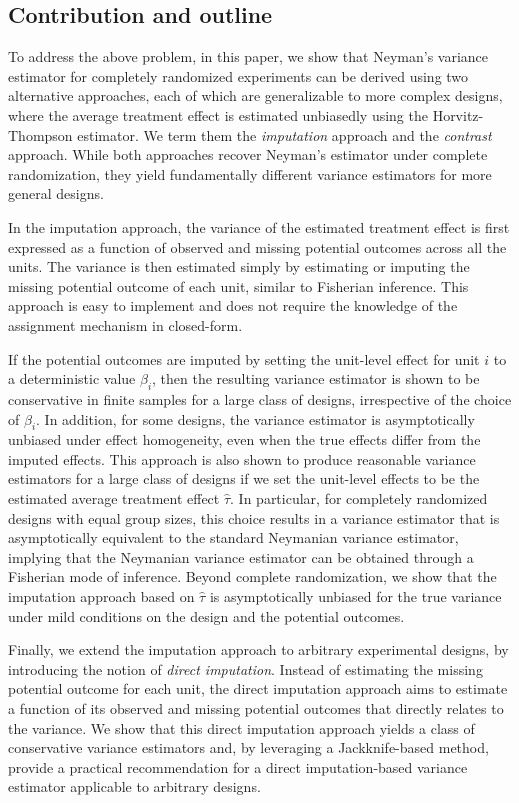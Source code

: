 \documentclass[12pt]{article}
\begin{document}
\subsection{Contribution and outline}
\label{sec_contribution}

To address the above problem, in this paper, we show that Neyman's variance estimator for completely randomized experiments can be derived using two alternative approaches, each of which are generalizable to more complex designs, where the average treatment effect is estimated unbiasedly using the Horvitz-Thompson estimator. We term them the \textit{imputation} approach and the \textit{contrast} approach. 
While both approaches recover Neyman's estimator under complete randomization, they yield fundamentally different variance estimators for more general designs.  

In the imputation approach, the variance of the estimated treatment effect is first expressed as a function of observed and missing potential outcomes across all the units. The variance is then estimated simply by estimating or imputing the missing potential outcome of each unit, similar to Fisherian inference. This approach is easy to implement and does not require the knowledge of the assignment mechanism in closed-form.

If the potential outcomes are imputed by setting the unit-level effect for unit $i$ to a deterministic value $\beta_i$, then the resulting variance estimator is shown to be conservative in finite samples for a large class of designs, irrespective of the choice of $\beta_i$. 
In addition, for some designs, the variance estimator is asymptotically unbiased under effect homogeneity, even when the true effects differ from the imputed effects.
This approach is also shown to produce reasonable variance estimators for a large class of designs if we set the unit-level effects to be the estimated average treatment effect $\hat{\tau}$. In particular, for completely randomized designs with equal group sizes, this choice results in a variance estimator that is asymptotically equivalent to the standard Neymanian variance estimator, implying that the Neymanian variance estimator can be obtained through a Fisherian mode of inference. Beyond complete randomization, we show that the imputation approach based on $\hat{\tau}$ is asymptotically unbiased for the true variance under mild conditions on the design and the potential outcomes.

Finally, we extend the imputation approach to arbitrary experimental designs, by introducing the notion of \textit{direct imputation}. Instead of estimating the missing potential outcome for each unit, the direct imputation approach aims to estimate a function of its observed and missing potential outcomes that directly relates to the variance. We show that this direct imputation approach yields a class of conservative variance estimators and, by leveraging a Jackknife-based method, provide a practical recommendation for a direct imputation-based variance estimator applicable to arbitrary designs. 
\end{document}
